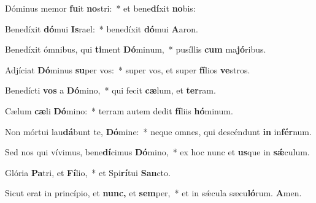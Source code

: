 \item Dóminus memor \textbf{fu}it \textbf{no}stri:~* et bene\textbf{dí}xit \textbf{no}bis:
\item Benedíxit \textbf{dó}mui \textbf{Is}rael:~* benedíxit \textbf{dó}mui \textbf{A}aron.
\item Benedíxit ómnibus, qui \textbf{ti}ment \textbf{Dó}minum,~* pusíllis \textbf{cum} ma\textbf{jó}ribus.
\item Adjíciat \textbf{Dó}minus \textbf{su}per vos:~* super vos, et super \textbf{fí}lios \textbf{ve}stros.
\item Benedícti \textbf{vos} a \textbf{Dó}mino,~* qui fecit \textbf{cæ}lum, et \textbf{ter}ram.
\item Cælum \textbf{cæ}li \textbf{Dó}mino:~* terram autem dedit \textbf{fí}liis \textbf{hó}minum.
\item Non mórtui lau\textbf{dá}bunt te, \textbf{Dó}mine:~* neque omnes, qui descéndunt \textbf{in} in\textbf{fér}num.
\item Sed nos qui vívimus, bene\textbf{dí}cimus \textbf{Dó}mino,~* ex hoc nunc et \textbf{us}que in \textbf{sǽ}culum.
\item Glória \textbf{Pa}tri, et \textbf{Fí}lio,~* et Spi\textbf{rí}tui \textbf{San}cto.
\item Sicut erat in princípio, et \textbf{nunc,} et \textbf{sem}per,~* et in sǽcula sæcu\textbf{ló}rum. \textbf{A}men.
